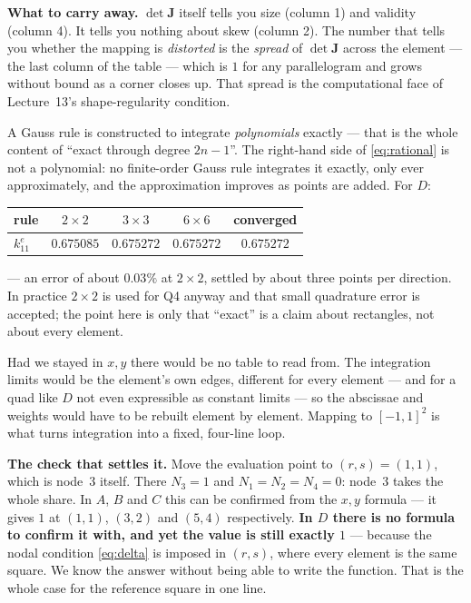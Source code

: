 \documentclass[11pt]{article}
\begin{document}
{{\medskip
\textbf{What to carry away.} $\det\bm{J}$ itself tells you size (column 1) and
validity (column 4). It tells you nothing about skew (column 2). The number
that tells you whether the mapping is \emph{distorted} is the \emph{spread} of
$\det\bm{J}$ across the element --- the last column of the table --- which is
$1$ for any parallelogram and grows without bound as a corner closes up. That
spread is the computational face of Lecture~13's shape-regularity condition.}}

\medskip
\noindent
A Gauss rule is constructed to integrate \emph{polynomials} exactly --- that is
the whole content of ``exact through degree $2n-1$''. The right-hand side of
\eqref{eq:rational} is not a polynomial: no finite-order Gauss rule integrates
it exactly, only ever approximately, and the approximation improves as points
are added. For $D$:
\begin{center}\small
\renewcommand{\arraystretch}{1.2}
\begin{tabular}{@{}lcccc@{}}
\toprule
rule & $2\times2$ & $3\times3$ & $6\times6$ & converged\\
\midrule
$k^{e}_{11}$ & $0.675085$ & $0.675272$ & $0.675272$ & $0.675272$\\
\bottomrule
\end{tabular}
\end{center}
\noindent
--- an error of about $0.03\%$ at $2\times2$, settled by about three points
per direction. In practice $2\times2$ is used for Q4 anyway and that small
quadrature error is accepted; the point here is only that ``exact'' is a claim
about rectangles, not about every element.

\medskip
Had we stayed in $x,y$ there would be no table to read from. The integration
limits would be the element's own edges, different for every element --- and
for a quad like $D$ not even expressible as constant limits --- so the
abscissae and weights would have to be rebuilt element by element. Mapping to
$[-1,1]^{2}$ is what turns integration into a fixed, four-line loop.

\medskip
\noindent
\textbf{The check that settles it.} Move the evaluation point to
$(r,s)=(1,1)$, which is node~$3$ itself. There
$N_{3}=1$ and $N_{1}=N_{2}=N_{4}=0$: node~$3$ takes the whole share. In
$A$, $B$ and $C$ this can be confirmed from the $x,y$ formula --- it gives $1$
at $(1,1)$, $(3,2)$ and $(5,4)$ respectively. \textbf{In $D$ there is no
formula to confirm it with, and yet the value is still exactly $1$} --- because
the nodal condition \eqref{eq:delta} is imposed in $(r,s)$, where every element
is the same square. We know the answer without being able to write the
function. That is the whole case for the reference square in one line.
\end{document}
